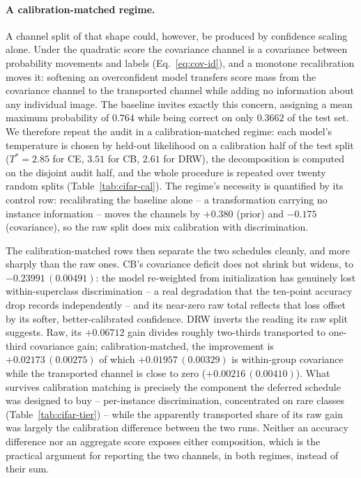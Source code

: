 \paragraph{A calibration-matched regime.} A channel split of that shape could, however,
be produced by confidence scaling alone. Under the quadratic score the covariance channel
is a covariance between probability movements and labels
(Eq.~\eqref{eq:cov-id}), and a monotone recalibration moves it: softening an
overconfident model transfers score mass from the covariance channel to the transported channel while
adding no information about any individual image. The baseline invites exactly this
concern, assigning a mean maximum probability of $0.764$ while being correct on only
$0.3662$ of the test set. We therefore repeat the audit in a calibration-matched regime:
each model's temperature is chosen by held-out likelihood on a calibration half of the
test split ($T^*=2.85$ for CE, $3.51$ for CB, $2.61$ for DRW), the decomposition is
computed on the disjoint audit half, and the whole procedure is repeated over twenty
random splits (Table~\ref{tab:cifar-cal}). The regime's necessity is quantified by its
control row: recalibrating the baseline alone -- a transformation carrying no instance
information -- moves the channels by $+0.380$ (prior) and $-0.175$ (covariance), so the
raw split does mix calibration with discrimination.

The calibration-matched rows then separate the two schedules cleanly, and more sharply
than the raw ones. CB's covariance deficit does not shrink but widens, to
$-0.23991\,(0.00491)$: the model re-weighted from initialization has genuinely lost
within-superclass discrimination -- a real degradation that the ten-point accuracy drop
records independently -- and its near-zero raw total reflects that loss offset by its
softer, better-calibrated confidence. DRW inverts the reading its raw split suggests.
Raw, its $+0.06712$ gain divides roughly two-thirds transported to one-third covariance gain;
calibration-matched, the improvement is $+0.02173\,(0.00275)$ of which
$+0.01957\,(0.00329)$ is within-group covariance while the transported channel is close to zero
($+0.00216\,(0.00410)$). What survives calibration matching is precisely the component
the deferred schedule was designed to buy -- per-instance discrimination, concentrated
on rare classes (Table~\ref{tab:cifar-tier}) -- while the apparently transported
share of its raw gain was largely the calibration difference between the two runs.
Neither an accuracy difference nor an aggregate score exposes either composition, which
is the practical argument for reporting the two channels, in both regimes, instead of
their sum.

